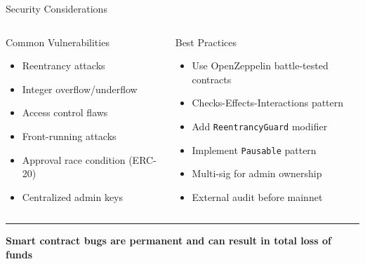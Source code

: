 \documentclass[8pt,aspectratio=169]{beamer}
\newcommand{\bottomnote}[1]{\vfill\vspace{-2mm}\textcolor{mllavender2}{\rule{\textwidth}{0.4pt}}\vspace{1mm}\footnotesize\textbf{#1}}
\begin{document}
\begin{frame}{Security Considerations}
  \begin{columns}[T]
      \begin{alertblock}{Common Vulnerabilities}
        \begin{itemize}\setlength\itemsep{2pt}
          \scriptsize
          \item[\textcolor{mlred}{\textbullet}] Reentrancy attacks
          \item[\textcolor{mlred}{\textbullet}] Integer overflow/underflow
          \item[\textcolor{mlred}{\textbullet}] Access control flaws
          \item[\textcolor{mlred}{\textbullet}] Front-running attacks
          \item[\textcolor{mlred}{\textbullet}] Approval race condition (ERC-20)
          \item[\textcolor{mlred}{\textbullet}] Centralized admin keys
        \end{itemize}
      \end{alertblock}

      \begin{block}{Best Practices}
        \begin{itemize}\setlength\itemsep{2pt}
          \scriptsize
          \item[\textcolor{mlgreen}{\checkmark}] Use OpenZeppelin battle-tested contracts
          \item[\textcolor{mlgreen}{\checkmark}] Checks-Effects-Interactions pattern
          \item[\textcolor{mlgreen}{\checkmark}] Add \texttt{ReentrancyGuard} modifier
          \item[\textcolor{mlgreen}{\checkmark}] Implement \texttt{Pausable} pattern
          \item[\textcolor{mlgreen}{\checkmark}] Multi-sig for admin ownership
          \item[\textcolor{mlgreen}{\checkmark}] External audit before mainnet
        \end{itemize}
      \end{block}
  \end{columns}
  \bottomnote{Smart contract bugs are permanent and can result in total loss of funds}
\end{frame}
\end{document}
